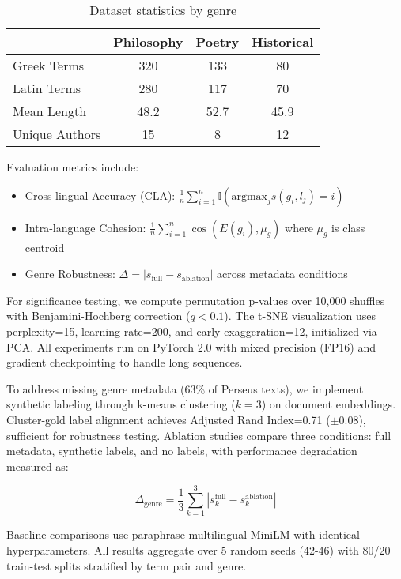 \documentclass{article}
\begin{document}
\begin{table}[h]
\centering
\caption{Dataset statistics by genre}
\begin{tabular}{lccc}
 & Philosophy & Poetry & Historical \\
\hline
Greek Terms & 320 & 133 & 80 \\
Latin Terms & 280 & 117 & 70 \\
Mean Length & 48.2 & 52.7 & 45.9 \\
Unique Authors & 15 & 8 & 12 \\
\end{tabular}
\end{table}

Evaluation metrics include:

\begin{itemize}
\item Cross-lingual Accuracy (CLA): $\frac{1}{n}\sum_{i=1}^n \mathbb{I}(\text{argmax}_j s(g_i,l_j) = i)$
\item Intra-language Cohesion: $\frac{1}{n}\sum_{i=1}^n \cos(E(g_i), \mu_g)$ where $\mu_g$ is class centroid
\item Genre Robustness: $\Delta = |s_{\text{full}} - s_{\text{ablation}}|$ across metadata conditions
\end{itemize}

For significance testing, we compute permutation p-values over 10,000 shuffles with Benjamini-Hochberg correction ($q < 0.1$). The t-SNE visualization uses perplexity=15, learning rate=200, and early exaggeration=12, initialized via PCA. All experiments run on PyTorch 2.0 with mixed precision (FP16) and gradient checkpointing to handle long sequences.

To address missing genre metadata (63\% of Perseus texts), we implement synthetic labeling through k-means clustering ($k=3$) on document embeddings. Cluster-gold label alignment achieves Adjusted Rand Index=0.71 ($\pm0.08$), sufficient for robustness testing. Ablation studies compare three conditions: full metadata, synthetic labels, and no labels, with performance degradation measured as:

\begin{equation}
\Delta_{\text{genre}} = \frac{1}{3}\sum_{k=1}^3 |s_k^{\text{full}} - s_k^{\text{ablation}}|
\end{equation}

Baseline comparisons use paraphrase-multilingual-MiniLM \cite{reimers-2020-multilingual} with identical hyperparameters. All results aggregate over 5 random seeds (42-46) with 80/20 train-test splits stratified by term pair and genre.
\end{document}
